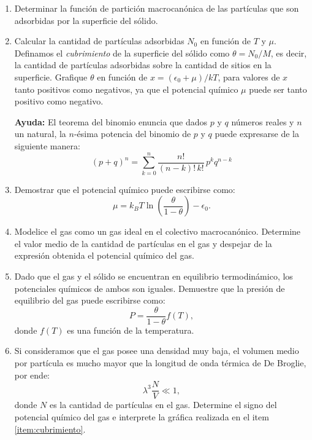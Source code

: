 \documentclass[a4paper,11pt]{article}
\begin{document}
\begin{enumerate}[label=(\alph*),
                  leftmargin=2\parindent,
                  rightmargin=2\parindent]

    \item{Determinar la función de partición macrocanónica de las 
          partículas que son adsorbidas por la superficie del sólido.}

    \item{\label{item:cubrimiento}
          Calcular la cantidad de partículas adsorbidas $N_0$ en función de 
          $T$ y $\mu$.
          Definamos el \emph{cubrimiento} de la superficie del sólido como 
          $\theta = N_0/M$, es decir, la cantidad de partículas adsorbidas 
          sobre la cantidad de sitios en la superficie.
          Grafique $\theta$ en función de $x = (\epsilon_0 + \mu)/kT$, para 
          valores de $x$ tanto positivos como negativos, ya que el potencial 
          químico $\mu$ puede ser tanto positivo como negativo.}
          
    {\small
    \textbf{Ayuda:}
    El teorema del binomio enuncia que dados $p$ y $q$ números reales y $n$ un
    natural, la $n$-ésima potencia del binomio de $p$ y $q$ puede expresarse
    de la siguiente manera:
    $$ (p + q)^n = \sum_{k=0}^n \frac{n!}{(n-k)! \, k!} \, p^k q^{n-k} $$
    }
    
    \item{Demostrar que el potencial químico puede escribirse 
          como:
          $$
          \mu =
          k_B T \ln \left( \frac{\theta}{1 - \theta} \right) - \epsilon_0.
          $$
          }
    
    \item{Modelice el gas como un gas ideal en el colectivo macrocanónico.
          Determine el valor medio de la cantidad de partículas en el gas y 
          despejar de la expresión obtenida el potencial químico del gas.
          }
    
    \item{Dado que el gas y el sólido se encuentran en equilibrio 
          termodinámico, los potenciales químicos de ambos son iguales. 
          Demuestre que la presión de equilibrio del gas puede escribirse 
          como:
          $$ P = \frac{\theta}{1 - \theta} f(T), $$
          donde $f(T)$ es una función de la temperatura.
          }
    
    \item{Si consideramos que el gas posee una densidad muy baja, el volumen 
          medio por partícula es mucho mayor que la longitud de onda térmica 
          de De Broglie, por ende:
          $$ \lambda^3 \frac{N}{V} \ll 1, $$
          donde $N$ es la cantidad de partículas en el gas.
          Determine el signo del potencial químico del gas e interprete la 
          gráfica realizada en el item \ref{item:cubrimiento}. }

\end{enumerate}
\end{document}
